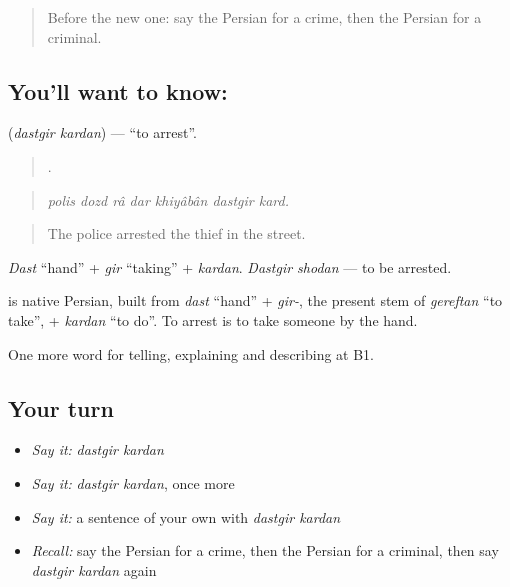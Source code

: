 \begin{quote}
Before the new one: say the Persian for a crime, then the Persian for a criminal.
\end{quote}

\subsection*{You'll want to know:  }
\textbf{ } (\emph{dastgir kardan}) — \textquotedblleft{}to arrest\textquotedblright{}.

\begin{quote}
      .
\end{quote}

\begin{quote}
\emph{polis dozd râ dar khiyâbân dastgir kard.}
\end{quote}

\begin{quote}
The police arrested the thief in the street.
\end{quote}

\emph{Dast} \textquotedblleft{}hand\textquotedblright{} + \emph{gir} \textquotedblleft{}taking\textquotedblright{} + \emph{kardan}. \emph{Dastgir shodan} — to be arrested.

\begin{cousinweb}
\textbf{ } is native Persian, built from \emph{dast} \textquotedblleft{}hand\textquotedblright{} + \emph{gir-}, the present stem of \emph{gereftan} \textquotedblleft{}to take\textquotedblright{}, + \emph{kardan} \textquotedblleft{}to do\textquotedblright{}. To arrest is to take someone by the hand.
\end{cousinweb}

\begin{grammarlens}[title={What you've built}]
One more word for telling, explaining and describing at B1.
\end{grammarlens}

\subsection*{Your turn}
\begin{itemize}
\raggedright
  \item \emph{Say it:} \emph{dastgir kardan}
  \item \emph{Say it:} \emph{dastgir kardan}, once more
  \item \emph{Say it:} a sentence of your own with \emph{dastgir kardan}
  \item \emph{Recall:} say the Persian for a crime, then the Persian for a criminal, then say \emph{dastgir kardan} again
\end{itemize}

